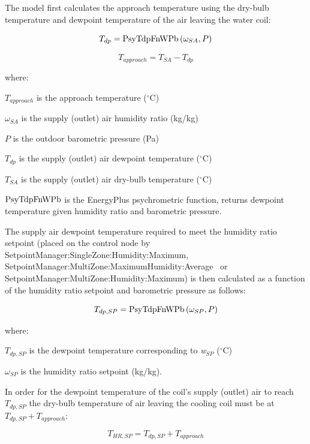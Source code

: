 The model first calculates the approach temperature using the dry-bulb temperature and dewpoint temperature of the air leaving the water coil:

\begin{equation}
{T_{dp}} = {\rm{PsyTdpFnWPb}}\left( {{\omega_{SA}},P} \right)
\end{equation}

\begin{equation}
{T_{approach}} = {T_{SA}} - {T_{dp}}
\end{equation}

where:

\({T_{approach}}\) is the approach temperature (\(^{\circ}\)C)

\({\omega_{SA}}\) is the supply (outlet) air humidity ratio (kg/kg)

\(P\) is the outdoor barometric pressure (Pa)

\({T_{dp}}\) is the supply (outlet) air dewpoint temperature (\(^{\circ}\)C)

\({T_{SA}}\) is the supply (outlet) air dry-bulb temperature (\(^{\circ}\)C)

\({\rm{PsyTdpFnWPb}}\) is the EnergyPlus psychrometric function, returns dewpoint temperature given humidity ratio and barometric pressure.

The supply air dewpoint temperature required to meet the humidity ratio setpoint (placed on the control node by SetpointManager:SingleZone:Humidity:Maximum, SetpointManager:MultiZone:MaximumHumidity:Average~ or SetpointManager:MultiZone:Humidity:Maximum) is then calculated as a function of the humidity ratio setpoint and barometric pressure as follows:

\begin{equation}
{T_{dp,SP}} = {\rm{PsyTdpFnWPb}}\left( {{\omega_{SP}},P} \right)
\end{equation}

where:

\({T_{dp,SP}}\) is the dewpoint temperature corresponding to \emph{w\(_{SP}\)} (\(^{\circ}\)C)

\({\omega_{SP}}\) is the humidity ratio setpoint (kg/kg).

In order for the dewpoint temperature of the coil's supply (outlet) air to reach \({T_{dp,SP}}\) the dry-bulb temperature of air leaving the cooling coil must be at \({T_{dp,SP}} + {T_{approach}}\):

\begin{equation}
{T_{HR,SP}} = {T_{dp,SP}} + {T_{approach}}
\end{equation}

